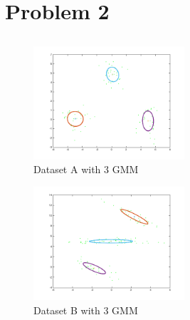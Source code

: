 \section{Problem 2}
\subsection{}
\begin{figure}[ht]
    \centering
  \vspace{-20pt}
    \includegraphics[width=0.5\textwidth]{figures/mixmodelA_3_20.png}
    \caption{Dataset A with 3 GMM}
    \vspace{4ex}
\end{figure}

\begin{figure}[ht]
    \centering
    \includegraphics[width=0.5\textwidth]{figures/mixmodelB_3_20.png}
    \caption{Dataset B with 3 GMM}
    \vspace{4ex}
\end{figure}

